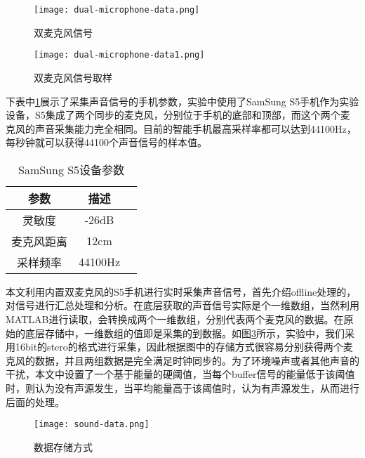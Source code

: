 \documentclass[winfonts]{njuthesis}
\begin{document}
		\begin{figure}[H]
			\centering
			\texttt{[image: dual-microphone-data.png]} 
			\caption{双麦克风信号}
			\label{fig: dual-microphone-data}
		\end{figure}
	
		\begin{figure}[H]
			\centering
			\texttt{[image: dual-microphone-data1.png]} 
			\caption{双麦克风信号取样}
			\label{fig: dual-microphone-data1}
		\end{figure}
		
		下表中\ref{table: parameters-of-S5}展示了采集声音信号的手机参数，实验中使用了SamSung S5手机作为实验设备，S5集成了两个同步的麦克风，分别位于手机的底部和顶部，而这个两个麦克风的声音采集能力完全相同。目前的智能手机最高采样率都可以达到44100Hz，每秒钟就可以获得44100个声音信号的样本值。
		
		\begin{table}[htbp]
			\setlength{\belowcaptionskip}{7pt}
			\caption{SamSung S5设备参数}
			\centering
			\begin{tabular}{ccc}
				\hline 
				参数 & 描述 \\
				\hline
				灵敏度 & -26dB\\
				麦克风距离 & 12cm \\
				采样频率 & 44100Hz\\
				\hline
			\end{tabular} 
			\vspace{0.2cm}
			\label{table: parameters-of-S5}
		\end{table}
	
		本文利用内置双麦克风的S5手机进行实时采集声音信号，首先介绍offline处理的，对信号进行汇总处理和分析。在底层获取的声音信号实际是个一维数组，当然利用MATLAB进行读取，会转换成两个一维数组，分别代表两个麦克风的数据。在原始的底层存储中，一维数组的值即是采集的到数据。如图\ref{fig: sound-data}所示，实验中，我们采用16bit的stero的格式进行采集，因此根据图中的存储方式很容易分别获得两个麦克风的数据，并且两组数据是完全满足时钟同步的。为了环境噪声或者其他声音的干扰，本文中设置了一个基于能量的硬阈值，当每个buffer信号的能量低于该阈值时，则认为没有声源发生，当平均能量高于该阈值时，认为有声源发生，从而进行后面的处理。
		
		\begin{figure}[H]
			\centering
			\texttt{[image: sound-data.png]} 
			\caption{数据存储方式}
			\label{fig: sound-data}
		\end{figure}
		
\end{document}
